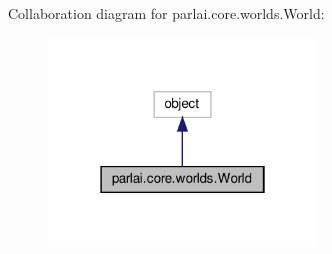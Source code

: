 Collaboration diagram for parlai.\+core.\+worlds.\+World\+:
\nopagebreak
\begin{figure}[H]
\begin{center}
\leavevmode
\includegraphics[width=202pt]{classparlai_1_1core_1_1worlds_1_1World__coll__graph}
\end{center}
\end{figure}
